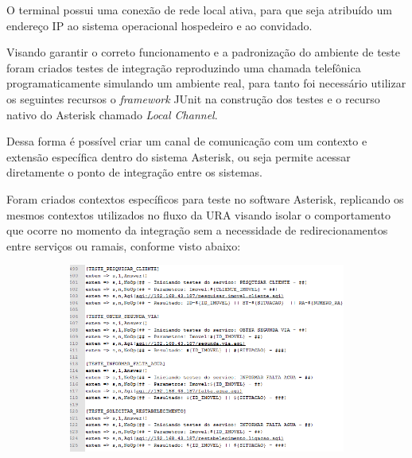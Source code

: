 O terminal possui uma conexão de rede local ativa, para que seja atribuído um endereço IP ao sistema operacional hospedeiro e ao convidado.

Visando garantir o correto funcionamento e a padronização do ambiente de teste foram criados testes de integração reproduzindo uma chamada telefônica programaticamente simulando um ambiente real, para tanto foi necessário utilizar os seguintes recursos o \textit{framework} JUnit na construção dos testes e o recurso nativo do Asterisk chamado \textit{Local Channel}.

Dessa forma é possível criar um canal de comunicação com um contexto e extensão específica dentro do sistema Asterisk, ou seja permite acessar diretamente o ponto de integração entre os sistemas.

Foram criados contextos específicos para teste no software Asterisk, replicando os mesmos contextos utilizados no fluxo da URA visando 
isolar o comportamento que ocorre no momento da integração sem a necessidade de redirecionamentos entre serviços ou ramais, conforme visto abaixo:

\begin{figure}[H]
	\centering
	\caption{\textbf{Declaração dos contextos de teste no Asterisk}}
	\label{figura:contextoTeste}
	\begin{subfigure}[H]{\textwidth}
		\centering
		\includegraphics{figuras/contexto_teste.png}
	\end{subfigure}
\end{figure}
	

